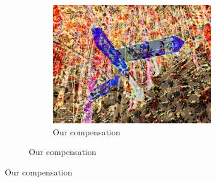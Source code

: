 \begin{figure}[ht]
\begin{subfigure}{\textwidth}
\begin{subfigure}{0.3\textwidth}
            \label{fig:intro_results_teaser_pixels_opt}
        \end{subfigure}
        \hfill
        \begin{subfigure}{0.3\textwidth}
            \centering
            \includegraphics[width=\textwidth]{images/01-results_teaser-stats_opt.jpg}
            \caption{Our compensation}
            \label{fig:intro_results_teaser_stats_opt}
        \end{subfigure}
        

\end{subfigure}
\end{figure}
